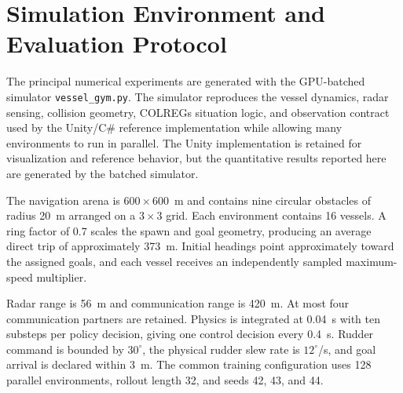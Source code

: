 \documentclass[final,5p,times,twocolumn]{elsarticle}
\begin{document}
\section{Simulation Environment and Evaluation Protocol}
\label{sec:simulation}
{\color{red}
The principal numerical experiments are generated with the GPU-batched simulator \texttt{vessel\_gym.py}. The simulator reproduces the vessel dynamics, radar sensing, collision geometry, COLREGs situation logic, and observation contract used by the Unity/C\# reference implementation while allowing many environments to run in parallel. The Unity implementation is retained for visualization and reference behavior, but the quantitative results reported here are generated by the batched simulator.

The navigation arena is $600\times600$~m and contains nine circular obstacles of radius 20~m arranged on a $3\times3$ grid. Each environment contains 16 vessels. A ring factor of 0.7 scales the spawn and goal geometry, producing an average direct trip of approximately 373~m. Initial headings point approximately toward the assigned goals, and each vessel receives an independently sampled maximum-speed multiplier.

Radar range is 56~m and communication range is 420~m. At most four communication partners are retained. Physics is integrated at 0.04~s with ten substeps per policy decision, giving one control decision every 0.4~s. Rudder command is bounded by $30^\circ$, the physical rudder slew rate is $12^\circ$/s, and goal arrival is declared within 3~m. The common training configuration uses 128 parallel environments, rollout length 32, and seeds 42, 43, and 44.

}
\end{document}
